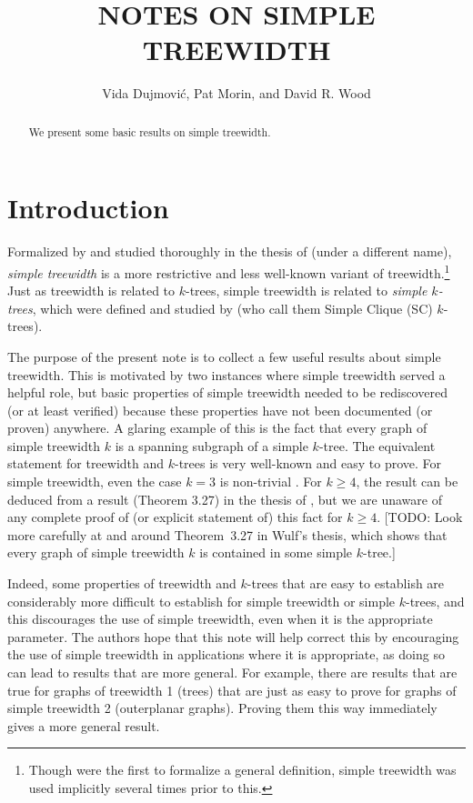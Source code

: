 \documentclass[kpfonts]{patmorin}
\title{\MakeUppercase{Notes on Simple Treewidth}}
\author{Vida Dujmović, Pat Morin, and David R. Wood}
\theoremstyle{named}
\begin{document}
\maketitle

\begin{abstract}
  We present some basic results on simple treewidth.
\end{abstract}

\section{Introduction}

Formalized by \citet{knauer.ueckerdt:simple} and studied thoroughly in the thesis of \citet{wulf:stacked} (under a different name), \emph{simple treewidth} is a more restrictive and less well-known variant of treewidth.\footnote{Though \citet{knauer.ueckerdt:simple} were the first to formalize a general definition, simple treewidth was used implicitly several times prior to this.}  Just as treewidth is related to $k$-trees, simple treewidth is related to \emph{simple $k$-trees}, which were defined and studied by \citet{markenzon.justel.ea:subclasses} (who call them Simple Clique (SC) $k$-trees).

The purpose of the present note is to collect a few useful results about simple treewidth.  This is motivated by two instances \cite{X,Y} where simple treewidth served a helpful role, but basic properties of simple treewidth needed to be rediscovered (or at least verified) because these properties have not been documented (or proven) anywhere.  A glaring example of this is the fact that every graph of simple treewidth $k$ is a spanning subgraph of a simple $k$-tree.  The equivalent statement for treewidth and $k$-trees is very well-known and easy to prove. For simple treewidth, even the case $k=3$ is non-trivial \cite{kratochvil.vaner:note,elmallah.colbourn:on}.  For $k\ge 4$, the result can be deduced from a result (Theorem 3.27) in the thesis of \citet{wulf:stacked}, but we are unaware of any complete proof of (or explicit statement of) this fact for $k\ge 4$.  [TODO: Look more carefully at and around Theorem~3.27 in Wulf's thesis, which shows that every graph of simple treewidth $k$ is contained in some simple $k$-tree.]

Indeed, some properties of treewidth and $k$-trees that are easy to establish are considerably more difficult to establish for simple treewidth or simple $k$-trees, and this discourages the use of simple treewidth, even when it is the appropriate parameter.  The authors hope that this note will help correct this by encouraging the use of simple treewidth in applications where it is appropriate, as doing so can lead to results that are more general.  For example, there are results that are true for graphs of treewidth 1 (trees) that are just as easy to prove for graphs of simple treewidth 2 (outerplanar graphs).  Proving them this way immediately gives a more general result.
\end{document}
